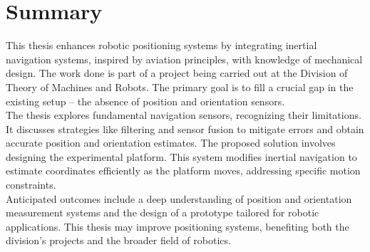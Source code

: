 \chapter{Summary}

This thesis enhances robotic positioning systems by integrating inertial navigation systems, inspired by aviation principles, with knowledge of mechanical design. The work done is part of a project being carried out at the Division of Theory of Machines and Robots. The primary goal is to fill a crucial gap in the existing setup – the absence of position and orientation sensors.\\

The thesis explores fundamental navigation sensors, recognizing their limitations. It discusses strategies like filtering and sensor fusion to mitigate errors and obtain accurate position and orientation estimates. The proposed solution involves designing the experimental platform. This system modifies inertial navigation to estimate coordinates efficiently as the platform moves, addressing specific motion constraints.\\

Anticipated outcomes include a deep understanding of position and orientation measurement systems and the design of a prototype tailored for robotic applications. This thesis may improve positioning systems, benefiting both the division's projects and the broader field of robotics.